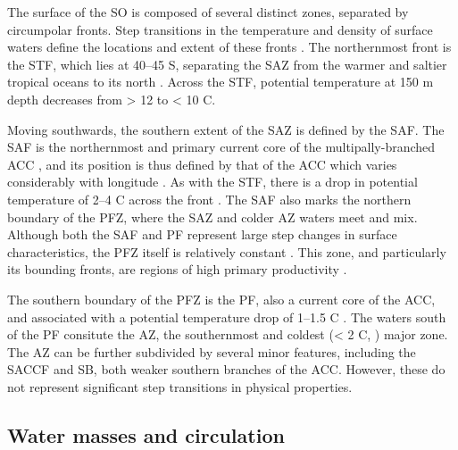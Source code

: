 The surface of the \ac{SO} is composed of several distinct zones, separated by circumpolar fronts.
Step transitions in the temperature and density of surface waters define the locations and extent of these fronts \cite{Sokolov:2002tc,Orsi:1995va}.
The northernmost front is the \ac{STF}, which lies at \textapprox{} 40--45\textdegree{} S, separating the \ac{SAZ} from the warmer and saltier tropical oceans to its north \cite{Sokolov:2002tc}.
Across the \ac{STF}, potential temperature at 150 m depth decreases from \textgreater{} 12 to \textless{} 10 \textdegree{}C.

Moving southwards, the southern extent of the \ac{SAZ} is defined by the \ac{SAF}.
The \ac{SAF} is the northernmost and primary current core of the multipally-branched \ac{ACC} \cite{Sokolov:2009wp}, and its position is thus defined by that of the \ac{ACC} which varies considerably with longitude \cite{Moore:1999to}.
As with the \ac{STF}, there is a drop in potential temperature of 2--4 \textdegree{}C across the front \cite{Sokolov:2002tc}.
The \ac{SAF} also marks the northern boundary of the \ac{PFZ}, where the \ac{SAZ} and colder \ac{AZ} waters meet and mix.
Although both the \ac{SAF} and \ac{PF} represent large step changes in surface characteristics, the \ac{PFZ} itself is relatively constant \cite{WhitworthIII:1987ky}.
This zone, and particularly its bounding fronts, are regions of high primary productivity \citep[e.g.][]{Laubscher:1993hu,Abell:2005ji}.

The southern boundary of the \ac{PFZ} is the \ac{PF}, also a current core of the \ac{ACC}, and associated with a potential temperature drop of \textapprox{} 1--1.5 \textdegree{}C \cite{Moore:1999to}.
The waters south of the \ac{PF} consitute the \ac{AZ}, the southernmost and coldest (\textless{} 2 \textdegree{}C, \citet{Sokolov:2002tc}) major zone.
The \ac{AZ} can be further subdivided by several minor features, including the \ac{SACCF} and \ac{SB}, both weaker southern branches of the \ac{ACC}.
However, these do not represent significant step transitions in physical properties.

\subsection{Water masses and circulation}

